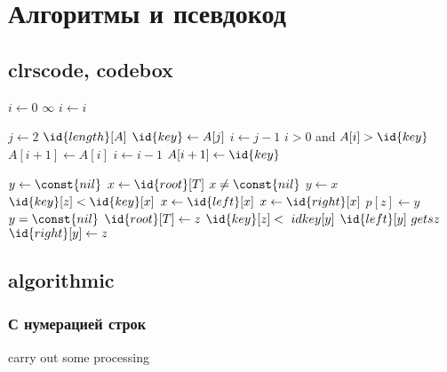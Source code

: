 
\section{Алгоритмы и псевдокод}


\subsection{clrscode, codebox}

\begin{codebox}
	\li \For 
			$i \gets 0 $ \To $\infty$
	\li \Do $i \gets i$
\end{codebox}

\begin{codebox}
	\li \For $j \gets 2$ \To $\id{length}[A]$
	\li \Do
		$\id{key} \gets A[j]$
	\li {}
	\li $i \gets j-1$
	\li \While $i > 0$ and $A[i] > \id{key}$
	\li \Do
		$A[i+1] \gets A[i]$
	\li $i \gets i-1$
	\End
	\li $A[i+1] \gets \id{key}$
		\End
\end{codebox}

\begin{codebox}
	\li $y \gets \const{nil}$
	\li $x \gets \id{root}[T]$
	\li 
		\While $x \neq \const{nil}$
	\li 
			\Do
				$y \gets x$
	\li 
				\If $\id{key}[z] < \id{key}[x]$
	\li 			\Then $x \gets \id{left}[x]$
	\li 		\Else $x \gets \id{right}[x]$
				\End
			\End
	\li $p[z] \gets y$
	\li \If $y = \const{nil}$
	\li 	\Then
			$\id{root}[T] \gets z$\>\>\>\>\>\>\>\>
	\li \Else
			\If $\id{key}[z] <\ id{key}[y]$
	\li 		\Then $\id{left}[y]\ gets z$
	\li 	\Else $\id{right}[y] \gets z$
			\End
		\End
\end{codebox}


\pagebreak
\subsection{algorithmic}

\subsubsection{С нумерацией строк}

\begin{algorithmic}[1]
	\STATE carry out some processing
	\ENDFOR
\end{algorithmic}

